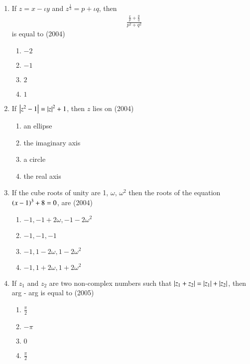 \documentclass[journal]{IEEEtran}
\begin{document}
\begin{enumerate}
	\item{If $z=x-\iota y$ and $z^{\frac{1}{3}}=p+\iota q$, then \begin{align*} &\frac{\frac{x}{p} + \frac{y}{q}}{p^2 + q^2} \end{align*} is equal to 
		\hfill (2004)
		\begin{multicols}{4}
		\begin{enumerate}
			\item{$-2$}
			\columnbreak
			\item{$-1$}
			\columnbreak
			\item{$2$}
			\columnbreak
			\item{$1$}
		\end{enumerate}
		\end{multicols}}

	\item{If $\left\vert z^2 - 1\right\vert = \left\vert z\right\vert^2 + 1$, then $z$ lies on \hfill (2004)
		\begin{multicols}{2}
		\begin{enumerate}
			\item{an ellipse}
			\item{the imaginary axis}
			\columnbreak
			\item{a circle}
			\item{the real axis}
		\end{enumerate}
		\end{multicols}}
	

	\item{If the cube roots of unity are 1, $\omega$, $\omega^2$ then the roots of the equation $\left(x-1\right)^3 + 8 = 0$, are \hfill (2004)
		\begin{multicols}{2}
		\begin{enumerate}
			\item{$-1,-1+2\omega,-1-2\omega ^2$}
			\item{$-1,-1,-1$}
			\columnbreak
			\item{$-1, 1-2\omega, 1-2\omega ^2$}
			\item{$-1, 1+2\omega, 1+2\omega ^2$}
		\end{enumerate}
		\end{multicols}}

	\item{If $z_1$ and $z_2$ are two non-complex numbers such that $\left\vert z_1 + z_2\right\vert = \left\vert z_1\right\vert + \left\vert z_2\right\vert$, then arg - arg is equal to \hfill (2005)
		\begin{multicols}{4}
		\begin{enumerate}
			\item{$\frac{\pi}{2}$}
			\columnbreak
			\item{$-\pi$}
			\columnbreak
			\item{$0$}
			\columnbreak
			\item{$\frac{\pi}{2}$}
		\end{enumerate}
		\end{multicols}}


\end{enumerate}
\end{document}
